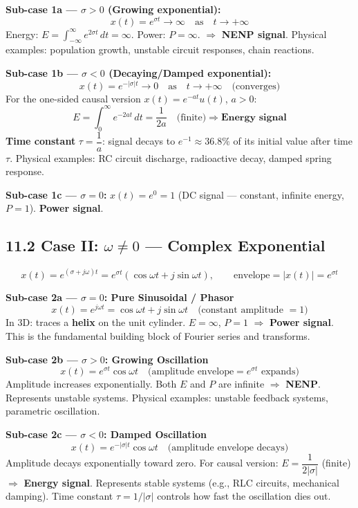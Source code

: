 \documentclass[10pt,a4paper]{article}
\begin{document}
\begin{propbox}
\textbf{Sub-case 1a --- $\sigma > 0$ (Growing exponential):}
\[
  x(t) = e^{\sigma t} \to \infty \quad \text{as} \quad t \to +\infty
\]
Energy: $E=\int_{-\infty}^{\infty}e^{2\sigma t}\,dt=\infty$. Power: $P=\infty$. $\Rightarrow$ \textbf{NENP signal}.
Physical examples: population growth, unstable circuit responses, chain reactions.

\medskip
\textbf{Sub-case 1b --- $\sigma < 0$ (Decaying/Damped exponential):}
\[
  x(t) = e^{-|\sigma| t} \to 0 \quad \text{as} \quad t \to +\infty \quad\text{(converges)}
\]
For the one-sided causal version $x(t)=e^{-at}u(t)$, $a>0$:
\[
  E = \int_0^{\infty} e^{-2at}\,dt = \frac{1}{2a} \quad\text{(finite)} \Rightarrow \textbf{Energy signal}
\]
\textbf{Time constant} $\tau = \dfrac{1}{a}$: signal decays to $e^{-1}\approx36.8\%$ of its initial value after time $\tau$.
Physical examples: RC circuit discharge, radioactive decay, damped spring response.

\medskip
\textbf{Sub-case 1c --- $\sigma = 0$:}
$x(t) = e^0 = 1$ (DC signal --- constant, infinite energy, $P=1$). \textbf{Power signal}.
\end{propbox}

\subsection*{11.2 Case II: $\omega \neq 0$ --- Complex Exponential}

\[
  x(t) = e^{(\sigma+j\omega)t} = e^{\sigma t}(\cos\omega t + j\sin\omega t), \qquad
  \text{envelope} = |x(t)| = e^{\sigma t}
\]

\begin{propbox}
\textbf{Sub-case 2a --- $\sigma = 0$: Pure Sinusoidal / Phasor}
\[
  x(t) = e^{j\omega t} = \cos\omega t + j\sin\omega t \quad\text{(constant amplitude $= 1$)}
\]
In 3D: traces a \textbf{helix} on the unit cylinder. $E=\infty$, $P=1$ $\Rightarrow$ \textbf{Power signal}.
This is the fundamental building block of Fourier series and transforms.

\medskip
\textbf{Sub-case 2b --- $\sigma > 0$: Growing Oscillation}
\[
  x(t) = e^{\sigma t}\cos\omega t \quad\text{(amplitude envelope} = e^{\sigma t} \text{ expands)}
\]
Amplitude increases exponentially. Both $E$ and $P$ are infinite $\Rightarrow$ \textbf{NENP}.
Represents unstable systems. Physical examples: unstable feedback systems, parametric oscillation.

\medskip
\textbf{Sub-case 2c --- $\sigma < 0$: Damped Oscillation}
\[
  x(t) = e^{-|\sigma| t}\cos\omega t \quad\text{(amplitude envelope decays)}
\]
Amplitude decays exponentially toward zero. For causal version: $E=\dfrac{1}{2|\sigma|}$ (finite)
$\Rightarrow$ \textbf{Energy signal}. Represents stable systems (e.g., RLC circuits, mechanical damping).
Time constant $\tau = 1/|\sigma|$ controls how fast the oscillation dies out.
\end{propbox}
\end{document}

